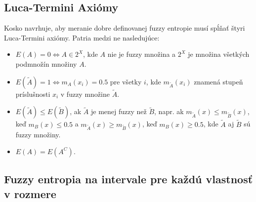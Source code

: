 \subsection*{Luca-Termini Axiómy}
Kosko \cite{kosko25} navrhuje, aby meranie dobre definovanej fuzzy entropie musí spĺňať štyri Luca-Termini axiómy. Patria medzi ne nasledujúce:
\begin{itemize}
	\item $E(A)=0 \iff A\in 2^X $, kde 
	$A$ nie je fuzzy množina a $2^X$ je množina všetkých podmnožín množiny 
	$A$. 
	
	\item
	$E(\tilde{A}) =1 \iff m_{{A}}(x_i) =0.5$ pre všetky $i$, kde $m_{\tilde{A}}(x_i)$
	znamená stupeň príslušnosti 
	$x_i$ 
	v fuzzy množine $\tilde{A}$. \item $E(\tilde{A}) \leq E(\tilde{B}) $,  ak 
	$\tilde{A}$ je menej fuzzy než $\tilde{B}$, napr. ak $m_{\tilde{A}}(x) \leq m_{\tilde{B}} (x)$,  keď 
	$m_B(x) \leq 0.5$ a $m_{\tilde{A}}(x) \geq m_{\tilde{B}}(x)$, 
	keď $m_B(x) \geq 0.5$, kde $\tilde{A}$ aj $\tilde{B}$ sú fuzzy množiny. 
	\item 
	$E(A)=E(A^C)$.
\end{itemize} 


\subsection*{Fuzzy entropia na intervale pre každú vlastnosť v rozmere}



